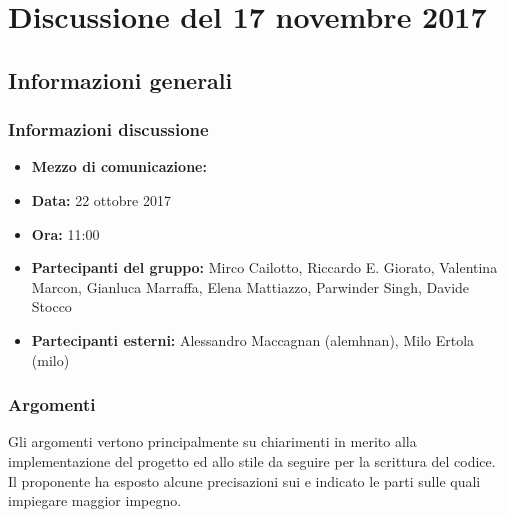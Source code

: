 \documentclass[Verbale171122.tex]{subfiles}
\begin{document}
\chapter{Discussione del 17 novembre 2017}
\section{Informazioni generali}
\subsection{Informazioni discussione}
\begin{itemize}
	\item \textbf{Mezzo di comunicazione:} 
	\item \textbf{Data:} 22 ottobre 2017
	\item \textbf{Ora:} 11:00
	\item \textbf{Partecipanti del gruppo:} Mirco Cailotto, Riccardo E. Giorato, Valentina Marcon, Gianluca Marraffa, Elena Mattiazzo, Parwinder Singh, Davide Stocco
	\item \textbf{Partecipanti esterni:} Alessandro Maccagnan (alemhnan), Milo Ertola (milo)
\end{itemize}
\subsection{Argomenti}
	Gli argomenti vertono principalmente su chiarimenti in merito alla implementazione del progetto ed allo stile da seguire per la scrittura del codice.\\
	Il proponente ha esposto alcune precisazioni sui  e indicato le parti sulle quali impiegare maggior impegno.
\end{document}
